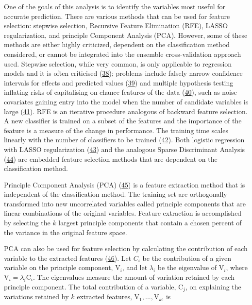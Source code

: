 \documentclass[12pt,]{article}
\begin{document}
One of the goals of this analysis is to identify the variables most
useful for accurate prediction. There are various methods that can be
used for feature selection: stepwise selection, Recursive Feature
Elimination (RFE), LASSO regularization, and principle Component
Analysis (PCA). However, some of these methods are either highly
criticized, dependent on the classification method considered, or cannot
be integrated into the ensemble cross-validation approach used. Stepwise
selection, while very common, is only applicable to regression models
and it is often criticised
(\protect\hyperlink{ref-kemp_applied_2003}{38}); problems include
falsely narrow confidence intervals for effects and predicted values
(\protect\hyperlink{ref-altman_bootstrap_1989}{39}) and multiple
hypothesis testing inflating risks of capitalising on chance features of
the data (\protect\hyperlink{ref-altman_practical_1991}{40}), such as
noise covariates gaining entry into the model when the number of
candidate variables is large
(\protect\hyperlink{ref-derksen_backward_1992}{41}). RFE is an iterative
procedure analogous of backward feature selection. A new classifier is
trained on a subset of the features and the importance of the feature is
a measure of the change in performance. The training time scales
linearly with the number of classifiers to be trained
(\protect\hyperlink{ref-guyon_gene_2002}{42}). Both logistic regression
with LASSO regularization
(\protect\hyperlink{ref-tibshirani_regression_1996}{43}) and the
analogous Sparse Discriminant Analysis
(\protect\hyperlink{ref-clemmensen_sparse_2011}{44}) are embedded
feature selection methods that are dependent on the classification
method.

Principle Component Analysis (PCA)
(\protect\hyperlink{ref-f.r.s_liii._1901}{45}) is a feature extraction
method that is independent of the classification method. The training
set are orthogonally transformed into new uncorrelated variables called
principle components that are linear combinations of the original
variables. Feature extraction is accomplished by selecting the \(k\)
largest principle components that contain a chosen percent of the
variance in the original feature space.

PCA can also be used for feature selection by calculating the
contribution of each variable to the extracted features
(\protect\hyperlink{ref-song_feature_2010}{46}). Let \(C_i\) be the
contribution of a given variable on the principle component,
\(\text{V}_i\), and let \(\lambda_i\) be the eigenvalue of
\(\text{V}_i\), where \(\text{V}_{i} = \lambda_i \text{C}_i\). The
eigenvalues measure the amount of variation retained by each principle
component. The total contribution of a variable, \(\text{C}_j\), on
explaining the variations retained by \(k\) extracted features,
\(\text{V}_1, ..., \text{V}_k\), is
\end{document}
